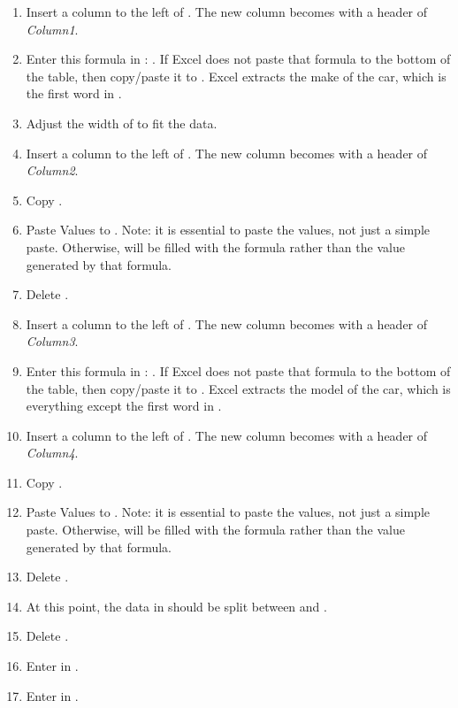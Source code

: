 \begin{enumbox}
\begin{enumerate}
		\begin{enumerate}
			\item Insert a column to the left of . The new column becomes  with a header of \textit{Column1}.
			\item Enter this formula in : . If Excel does not paste that formula to the bottom of the table, then copy/paste it to . Excel extracts the make of the car, which is the first word in .
			\item Adjust the width of  to fit the data.
			\item Insert a column to the left of . The new column becomes  with a header of \textit{Column2}.
			\item Copy .
			\item Paste Values to . Note: it is essential to paste the values, not just a simple paste. Otherwise,  will be filled with the formula rather than the value generated by that formula.
			\item Delete .
	
			\item Insert a column to the left of . The new column becomes  with a header of \textit{Column3}.
			\item Enter this formula in : . If Excel does not paste that formula to the bottom of the table, then copy/paste it to . Excel extracts the model of the car, which is everything except the first word in .
			\item Insert a column to the left of . The new column becomes  with a header of \textit{Column4}.
			\item Copy .
			\item Paste Values to . Note: it is essential to paste the values, not just a simple paste. Otherwise,  will be filled with the formula rather than the value generated by that formula.
			\item Delete .
			\item At this point, the data in  should be split between  and .
			\item Delete .
			\item Enter  in .
			\item Enter  in .
	

\end{enumerate}
\end{enumerate}
\end{enumbox}
